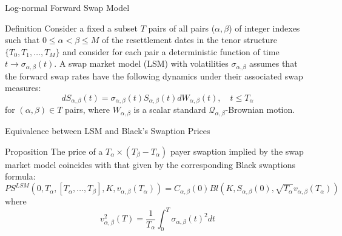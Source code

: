 \documentclass{beamer}
\begin{document}
\begin{frame}{Log-normal Forward Swap Model}
\begin{block}{Definition}
Consider a fixed a subset $T$ pairs of all pairs ($\alpha, \beta$) of integer indexes such that $0 \leq \alpha < \beta \leq M$ of the resettlement dates in the tenor structure $\{T_0, T_1,\ldots, T_M\}$ and consider for each pair a deterministic function of time $t\rightarrow \sigma_{\alpha,\beta}(t)$. A swap market model (LSM) with volatilities $\sigma_{\alpha,\beta}$ assumes that the forward swap rates have the following dynamics under their associated swap measures:
\begin{equation}
dS_{\alpha,\beta}(t) = \sigma_{\alpha,\beta}(t)S_{\alpha,\beta}(t)dW_{\alpha,\beta}(t),\quad t \leq T_\alpha
\end{equation}
for $(\alpha, \beta) \in T$ pairs, where $W_{\alpha,\beta}$ is a scalar standard $\mathcal{Q}_{\alpha,\beta}$-Brownian motion.
\end{block}
\end{frame}

\begin{frame}{Equivalence between LSM and Black’s Swaption Prices}
\begin{block}{Proposition}
The price of a $T_\alpha\times(T_\beta-T_\alpha)$ payer swaption implied by the swap market model coincides with that given by the corresponding Black swaptions formula:
\begin{equation}
	PS^{LSM}(0,T_\alpha, [T_\alpha,\ldots,T_\beta],K,v_{\alpha,\beta}(T_\alpha))=
	C_{\alpha, \beta}(0) Bl(K,S_{\alpha,\beta}(0),\sqrt{T_\alpha}v_{\alpha,\beta}(T_\alpha))
\end{equation}
where 
\begin{equation*}
v_{\alpha,\beta}^2(T) = \frac{1}{T_\alpha}\int_0^T\sigma_{\alpha,\beta}(t)^2dt 
\end{equation*}
\end{block}
\end{frame}
\end{document}
